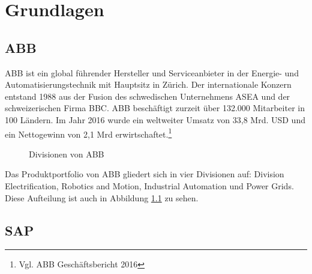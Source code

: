 
\chapter{Grundlagen}


\section{ABB}

ABB ist ein global f\"{u}hrender Hersteller und Serviceanbieter in der Energie- und Automatisierungstechnik mit Hauptsitz in Z\"{u}rich.
Der internationale Konzern entstand 1988 aus der Fusion des schwedischen Unternehmens \ac{ASEA} und der schweizerischen Firma \ac{BBC}. ABB besch\"{a}ftigt zurzeit \"{u}ber 132.000 Mitarbeiter in 100 L\"{a}ndern. Im Jahr 2016 wurde ein weltweiter Umsatz von 33,8 Mrd. USD und ein Nettogewinn von 2,1 Mrd erwirtschaftet.\footnote{Vgl. ABB Gesch\"{a}ftsbericht 2016} 
\linebreak



\begin{figure}[ht]
	\centering
	
	\caption{Divisionen von ABB}
	\label{fig1}
	
\end{figure}

Das Produktportfolio von ABB gliedert sich in vier Divisionen auf: Division Electrification, Robotics and Motion, Industrial Automation und Power Grids. Diese Aufteilung ist auch in Abbildung \ref{fig1} zu sehen.


\section{SAP}

